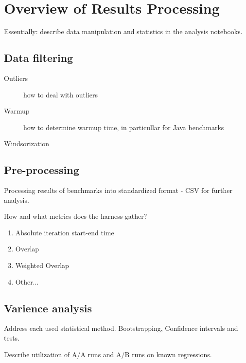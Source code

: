 \chapter{Overview of Results Processing}
\label{chap:results}

Essentially: describe data manipulation and statistics in the analysis notebooks.


\section{Data filtering}

\begin{description}
    \item[Outliers] how to deal with outliers
    \item[Warmup] how to determine warmup time, in particullar for Java benchmarks
    \item[Windsorization]
\end{description}


\section{Pre-processing}

Processing results of benchmarks into standardized format - CSV for further analysis.

How and what metrics does the harness gather?
\begin{enumerate}
    \item Absolute iteration start-end time
    \item Overlap
    \item Weighted Overlap
    \item Other...
\end{enumerate}


\section{Varience analysis}

Address each used statistical method.
Bootstrapping, Confidence intervals and tests.

Describe utilization of A/A runs and A/B runs on known regressions.
